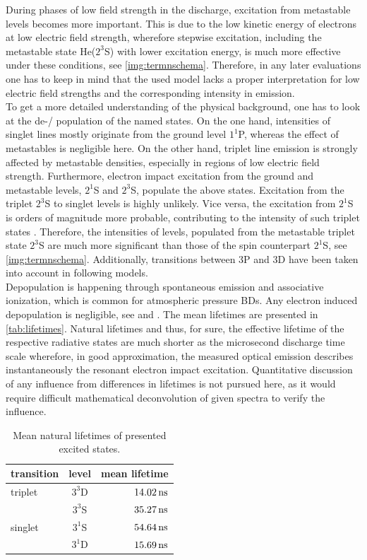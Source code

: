 \documentclass[a4paper,10pt,twoside]{article}
\begin{document}
			During phases of low field strength in the discharge, excitation from metastable levels becomes more important. This is due to the low kinetic energy of electrons at low electric field strength, wherefore stepwise excitation, including the metastable state He($2^3$S) with lower excitation energy, is much more effective under these conditions, see \autoref{img:termnschema}. Therefore, in any later evaluations one has to keep in mind that the used model lacks a proper interpretation for low electric field strengths and the corresponding intensity in emission.\\
			To get a more detailed understanding of the physical background, one has to look at the de-/ population of the named states. On the one hand, intensities of singlet lines mostly originate from the ground level $1^1$P, whereas the effect of metastables is negligible here. On the other hand, triplet line emission is strongly affected by metastable densities, especially in regions of low electric field strength. Furthermore, electron impact excitation from the ground and metastable levels, $2^1$S and $2^3$S, populate the above states. Excitation from the triplet $2^3$S to singlet levels is highly unlikely. Vice versa, the excitation from $2^1$S is orders of magnitude more probable, contributing to the intensity of such triplet states \cite{linratio1_14}. Therefore, the intensities of levels, populated from the metastable triplet state $2^3$S are much more significant than those of the spin counterpart $2^1$S, see \autoref{img:termnschema}. Additionally, transitions between 3P and 3D have been taken into account in following models.\\
			Depopulation is happening through spontaneous emission and associative ionization, which is common for atmospheric pressure BDs. Any electron induced depopulation is negligible, see \cite{PhysRevA.21.188} and \cite{0963-0252-14-4-011}. The mean lifetimes are presented in \autoref{tab:lifetimes}. Natural lifetimes and thus, for sure, the effective lifetime of the respective radiative states are much shorter as the microsecond discharge time scale wherefore, in good approximation, the measured optical emission describes instantaneously the resonant electron impact excitation. Quantitative discussion of any influence from differences in lifetimes is not pursued here, as it would require difficult mathematical deconvolution of given spectra to verify the influence.
			
				\begin{table}[t!]
					\centering
					\begin{tabular}{l|c|r}
						transition & level & mean lifetime \\ \hline \hline
						triplet & $3^3$D & $\unit[14.02]{ns}$ \\ \cline{2-3}
						 & $3^3$S & $\unit[35.27]{ns}$ \\ \hline
						 singlet & $3^1$S & $\unit[54.64]{ns}$ \\ \cline{2-3}
						 & $3^1$D & $\unit[15.69]{ns}$
					\end{tabular}
					\caption{Mean natural lifetimes of presented excited states. \cite{lifetimes} \cite{linratio1_14}}
					\label{tab:lifetimes}
				\end{table}
			
\end{document}
